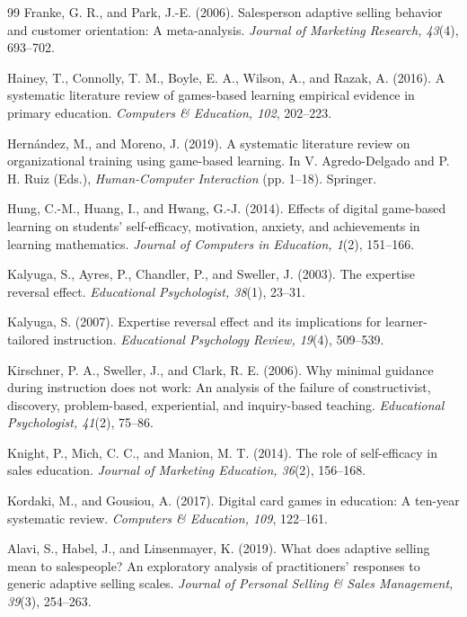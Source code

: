 \documentclass[12pt]{report}
\begin{document}
\begin{thebibliography}{99}
Franke, G. R., and Park, J.-E. (2006).
Salesperson adaptive selling behavior and customer orientation: A meta-analysis.
\textit{Journal of Marketing Research, 43}(4), 693--702.

Hainey, T., Connolly, T. M., Boyle, E. A., Wilson, A., and Razak, A. (2016).
A systematic literature review of games-based learning empirical evidence in primary education.
\textit{Computers \& Education, 102}, 202--223.

Hern\'andez, M., and Moreno, J. (2019).
A systematic literature review on organizational training using game-based learning.
In V. Agredo-Delgado and P. H. Ruiz (Eds.), \textit{Human-Computer Interaction} (pp. 1--18).
Springer.

Hung, C.-M., Huang, I., and Hwang, G.-J. (2014).
Effects of digital game-based learning on students' self-efficacy, motivation, anxiety, and achievements in learning mathematics.
\textit{Journal of Computers in Education, 1}(2), 151--166.

Kalyuga, S., Ayres, P., Chandler, P., and Sweller, J. (2003).
The expertise reversal effect.
\textit{Educational Psychologist, 38}(1), 23--31.

Kalyuga, S. (2007).
Expertise reversal effect and its implications for learner-tailored instruction.
\textit{Educational Psychology Review, 19}(4), 509--539.

Kirschner, P. A., Sweller, J., and Clark, R. E. (2006).
Why minimal guidance during instruction does not work: An analysis of the failure of constructivist, discovery, problem-based, experiential, and inquiry-based teaching.
\textit{Educational Psychologist, 41}(2), 75--86.

Knight, P., Mich, C. C., and Manion, M. T. (2014).
The role of self-efficacy in sales education.
\textit{Journal of Marketing Education, 36}(2), 156--168.

Kordaki, M., and Gousiou, A. (2017).
Digital card games in education: A ten-year systematic review.
\textit{Computers \& Education, 109}, 122--161.

Alavi, S., Habel, J., and Linsenmayer, K. (2019).
What does adaptive selling mean to salespeople? An exploratory analysis of practitioners' responses to generic adaptive selling scales.
\textit{Journal of Personal Selling \& Sales Management, 39}(3), 254--263.


\end{thebibliography}
\end{document}
